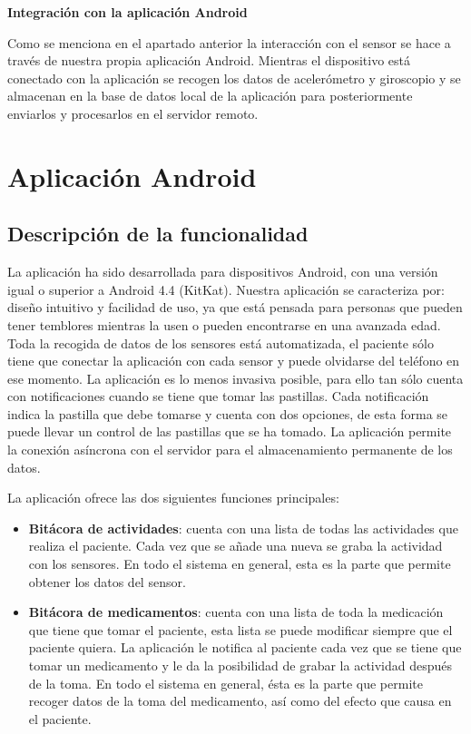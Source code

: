 \documentclass[11pt,spanish]{article}
\begin{document}
{\bf Integración con la aplicación Android}
\newline

Como se menciona en el apartado anterior la interacción con el sensor se hace a través de nuestra propia aplicación Android. Mientras el dispositivo está conectado con la aplicación se recogen los datos de acelerómetro y giroscopio y se almacenan en la base de datos local de la aplicación para posteriormente enviarlos y procesarlos en el servidor remoto.
\newpage

\section{Aplicación Android}
\subsection{Descripción de la funcionalidad}
La aplicación ha sido desarrollada para dispositivos Android, con una versión igual o superior a Android 4.4 (KitKat). Nuestra aplicación se caracteriza por: diseño intuitivo y facilidad de uso, ya que está pensada para personas que pueden tener temblores mientras la usen o pueden encontrarse en una avanzada edad. Toda la recogida de datos de los sensores está automatizada, el paciente sólo tiene que conectar la aplicación con cada sensor y puede olvidarse del teléfono en ese momento. La aplicación es lo menos invasiva posible, para ello tan sólo cuenta con notificaciones cuando se tiene que tomar las pastillas. Cada notificación indica la pastilla que debe tomarse y cuenta con dos opciones, de esta forma se puede llevar un control de las pastillas que se ha tomado. La aplicación permite la conexión asíncrona con el servidor para el almacenamiento permanente de los datos. 
\newline

La aplicación ofrece las dos siguientes funciones principales:

\begin{itemize}
	\item {\bf Bitácora de actividades}: cuenta con una lista de todas las actividades que realiza el paciente. Cada vez que se añade una nueva se graba la actividad con los sensores. En todo el sistema en general, esta es la parte que permite obtener los datos del sensor.
    \item {\bf Bitácora de medicamentos}: cuenta con una lista de toda la medicación que tiene que tomar el paciente, esta lista se puede modificar siempre que el paciente quiera. La aplicación le notifica al paciente cada vez que se tiene que tomar un medicamento y le da la posibilidad de grabar la actividad después de la toma. En todo el sistema en general, ésta es la parte que permite recoger datos de la toma del medicamento, así como del efecto que causa en el paciente.
\end{itemize}
\end{document}
